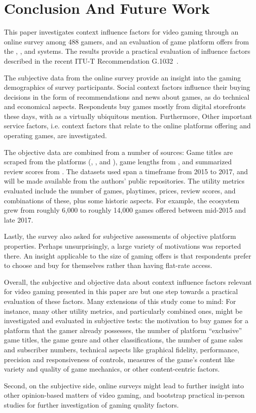 \section{Conclusion And Future Work}
\label{sec:conclusion}

This paper investigates context influence factors for video gaming
through an online survey among 488 gamers, and an evaluation of
game platform offers from the \steam, \psnow, and \gfnow systems.
The results provide a practical evaluation of influence factors
described in the recent \acrshort{ITU-T} Recommendation
G.1032~\cite{itutg1032}.

The subjective data from the online survey provide an insight into
the gaming demographics of survey participants.
Social context factors influence their buying decisions in the
form of recommendations and news about games, as do technical and
economical aspects.
Respondents buy games mostly from digital storefronts these days,
with \steam as a virtually ubiquitous mention.
Furthermore, Other important service factors, i.e. context factors
that relate to the online platforms offering and operating games,
are investigated.

The objective data are combined from a number of sources:
Game titles are scraped from the platforms (\gfnow, \psnow, and \steam),
game lengths from \hltb, and summarized review scores from
\metacritic.
The datasets used span a timeframe from 2015 to 2017, and will
be made
available from the authors' public repositories.
The utility metrics evaluated include the number
of games, playtimes, prices, review scores, and combinations of these,
plus some historic aspects.
For example, the \steam ecosystem grew from roughly 6,000 to roughly
14,000 games offered between mid-2015 and late 2017.

Lastly, the survey also asked for subjective assessments of objective
platform properties. Perhaps unsurprisingly, a large variety of
motivations was reported there. An insight applicable to the size
of gaming offers is that respondents prefer to choose and buy for
themselves rather than having flat-rate access.

Overall, the subjective and objective data about context influence
factors relevant for video gaming presented in this paper are but
one step towards a practical evaluation of these factors.
Many extensions of this study come to mind:
For instance, many other utility metrics, and
particularly combined ones, might be investigated and evaluated
in subjective tests:
the motivation to buy games for a platform that the gamer already
possesses,
the number of platform ``exclusive'' game titles,
the game genre and other classifications,
the number of game sales and subscriber numbers,
technical aspects like graphical fidelity, performance, precision
and responsiveness of controls,
measures of the game's content like variety and quality of game mechanics,
or other content-centric factors.

Second, on the subjective side, online surveys might lead to further
insight into other opinion-based matters of video gaming, and bootstrap
practical in-person studies for further investigation of gaming quality
factors.

